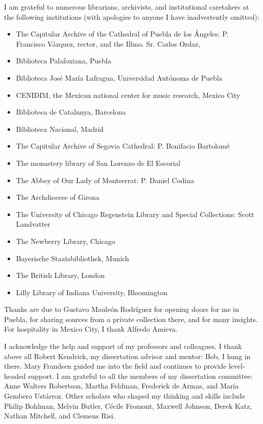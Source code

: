 I am grateful to numerous librarians, archivists, and institutional
caretakers at the following institutions (with apologies to anyone I have
inadvertently omitted):
\begin{itemize}
    \item The Capitular Archive of the Cathedral of Puebla de los Ángeles:
        P. Francisco Vázquez, rector, and the Illmo. Sr. Carlos
        Ordaz, 
    \item Biblioteca Palafoxiana, Puebla
    \item Biblioteca José María Lafragua, Universidad Autónoma de Puebla
    \item CENIDIM, the Mexican national center for music research, Mexico
        City
    \item Biblioteca de Catalunya, Barcelona
    \item Biblioteca Nacional, Madrid
    \item The Capitular Archive of Segovia Cathedral: P. Bonifacio Bartolomé
    \item The monastery library of San Lorenzo de El Escorial
    \item The Abbey of Our Lady of Montserrat: P. Daniel Codina
    \item The Archdiocese of Girona
    \item The University of Chicago Regenstein Library and Special
        Collections: Scott Landvatter
    \item The Newberry Library, Chicago
    \item Bayerische Staatsbibliothek, Munich
    \item The British Library, London
    \item Lilly Library of Indiana University, Bloomington
\end{itemize}
Thanks are due to Gustavo Mauleón Rodríguez for opening doors for me in
Puebla, for sharing sources from a private collection there, and for many
insights.
For hospitality in Mexico City, I thank Alfredo Amieva.

I acknowledge the help and support of my professors and colleagues.
I thank above all Robert Kendrick, my dissertation advisor and mentor: 
Bob, I hung in there. 
Mary Frandsen guided me into the field and continues to provide level-headed
support.
I am grateful to all the members of my dissertation committee: Anne Walters
Robertson, Martha Feldman, Frederick de Armas, and María Gembero Ustárroz.
Other scholars who shaped my thinking and skills include 
Philip Bohlman,
Melvin Butler, 
Cécile Fromont, 
Maxwell Johnson, 
Derek Katz, 
Nathan Mitchell,
and 
Clemens Risi.

